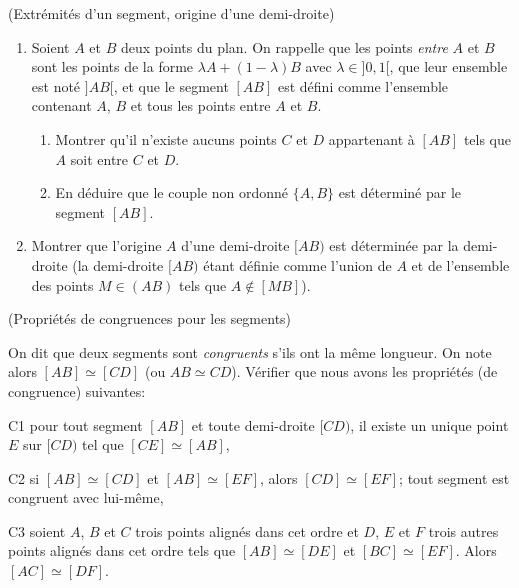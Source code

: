 \documentclass[a4paper,11pt,reqno]{amsart}
\begin{document}
\begin{exo} (Extrémités d'un segment, origine d'une demi-droite)

  \begin{enumerate}
    \item Soient $A$ et $B$ deux points du plan. On rappelle que les points \emph{entre} $A$ et $B$ sont les points de la forme $\lambda A + (1-\lambda) B$ avec $\lambda \in ]0,1[$, que leur ensemble est noté $]AB[$, et que le segment $[AB]$ est défini comme l'ensemble contenant $A$, $B$ et tous les points entre $A$ et $B$.
    \begin{enumerate}
      \item Montrer qu'il n'existe aucuns points $C$ et $D$ appartenant à $[AB]$ tels que $A$ soit entre $C$ et $D$.
      \item En déduire que le couple non ordonné $\{A,B\}$ est déterminé par le segment $[AB]$.
    \end{enumerate}
    \item Montrer que l'origine $A$ d'une demi-droite $[AB)$ est déterminée par la demi-droite (la demi-droite $[AB)$ étant définie comme l'union de $A$ et de l'ensemble des points $M \in (AB)$ tels que $A \notin [MB]$).
  \end{enumerate}
\end{exo}

\begin{exo} (Propriétés de congruences pour les segments)

On dit que deux segments sont \emph{congruents} s'ils ont la même longueur. On note alors $[AB]\simeq[CD]$ (ou $AB \simeq CD$). Vérifier que nous avons les propriétés (de congruence) suivantes:
  \begin{axioms}[leftmargin=2.8em]
    \item[C1] pour tout segment $[AB]$ et toute demi-droite $[CD)$, il existe un unique point $E$ sur $[CD)$ tel que $[CE]\simeq[AB]$,
    \item[C2] si $[AB]\simeq[CD]$ et $[AB]\simeq[EF]$, alors $[CD]\simeq[EF]$; tout segment est congruent avec lui-même,
    \item[C3] soient $A$, $B$ et $C$ trois points alignés dans cet ordre et $D$, $E$ et $F$ trois autres points alignés dans cet ordre tels que $[AB]\simeq [DE]$ et $[BC]\simeq[EF]$. Alors $[AC]\simeq[DF]$.
  \end{axioms}
\end{exo}
\end{document}
